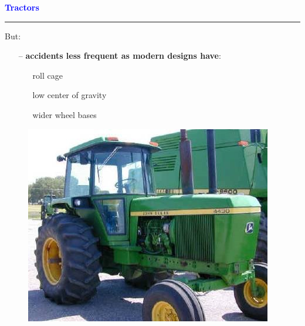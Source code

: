 \documentclass[pdf]{beamer}
\begin{document}
\begin{frame}
    \textcolor{Blue}{\textbf{\Large{Tractors}}}
    \textcolor{red}{\rule{10cm}{1mm}}

\vspace{5mm}

    {\textcolor{black}{}But:}
    {\begin{itemize}
    \item [\textcolor{black}{--}] {\normalsize \textbf{accidents less frequent as modern designs have}: }
      {\begin{itemize}
      \item[\textcolor{black}{\textbullet}] {\normalsize roll cage}
      \item[\textcolor{black}{\textbullet}] {\normalsize low center of gravity}
      \item[\textcolor{black}{\textbullet}] {\normalsize wider wheel bases}
      \end{itemize}}
    \end{itemize}}

	\begin{figure}
    \includegraphics[scale=0.5]{9_tractor.jpg}
   	\end{figure}

\end{frame}
\end{document}
